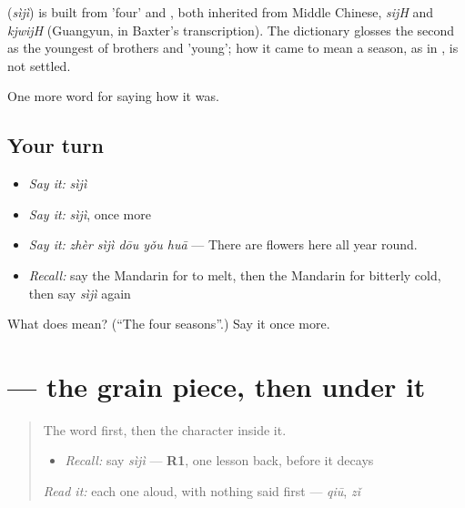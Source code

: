 \begin{cousinweb}
\textbf{} (\emph{sìjì}) is built from  'four' and , both inherited from Middle Chinese, \emph{sijH} and \emph{kjwijH} (Guangyun, in Baxter's transcription). The dictionary glosses the second as the youngest of brothers and 'young'; how it came to mean a season, as in , is not settled.
\end{cousinweb}

\begin{grammarlens}[title={What you've built}]
One more word for saying how it was.
\end{grammarlens}

\subsection*{Your turn}
\begin{itemize}
\raggedright
  \item \emph{Say it:} \emph{sìjì}
  \item \emph{Say it:} \emph{sìjì}, once more
  \item \emph{Say it:} \emph{zhèr sìjì dōu yǒu huā} — There are flowers here all year round.
  \item \emph{Recall:} say the Mandarin for to melt, then the Mandarin for bitterly cold, then say \emph{sìjì} again
\end{itemize}

\begin{tcolorbox}[breakable,colback=teal!4,colframe=teal!35!black,title={Before you move on}]
What does  mean? (\textquotedblleft{}The four seasons\textquotedblright{}.) Say it once more.
\end{tcolorbox}
\section[\texorpdfstring{\zh{季} (jì)}{季 (jì)}]{ — the grain piece, then  under it}

\label{lesson:ZH-W515-ji-season}



\begin{quote}
The word first, then the character inside it.

\begin{itemize}
\raggedright
  \item \emph{Recall:} say \emph{sìjì} — \textbf{R1}, one lesson back, before it decays
\end{itemize}

\begin{quote}
 
\end{quote}

\emph{Read it:} each one aloud, with nothing said first — \emph{qiū}, \emph{zǐ}
\end{quote}

